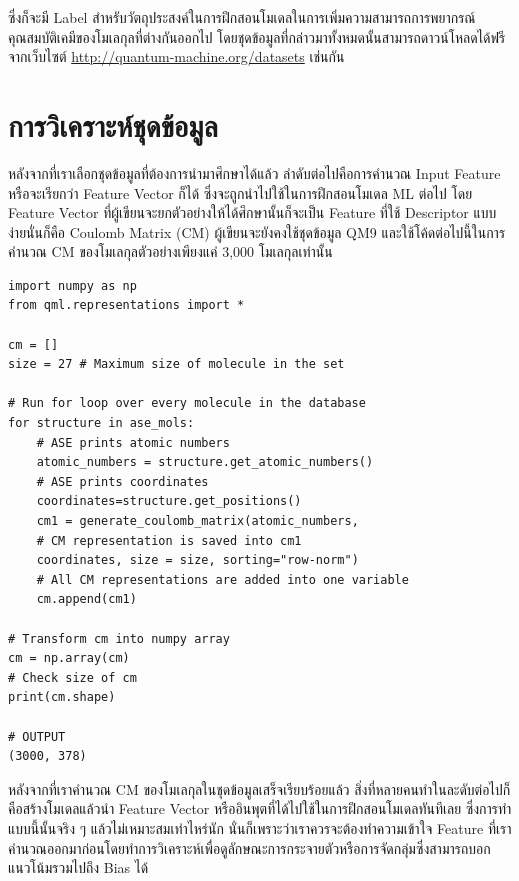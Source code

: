 \noindent ซึ่งก็จะมี Label สำหรับวัตถุประสงค์ในการฝึกสอนโมเดลในการเพิ่มความสามารถการพยากรณ์คุณสมบัติเคมีของโมเลกุลที่ต่างกันออกไป 
โดยชุดข้อมูลที่กล่าวมาทั้งหมดนั้นสามารถดาวน์โหลดได้ฟรีจากเว็บไซต์ \url{http://quantum-machine.org/datasets} เช่นกัน

\section{การวิเคราะห์ชุดข้อมูล}
\label{sec:dataset_analysis}

หลังจากที่เราเลือกชุดข้อมูลที่ต้องการนำมาศึกษาได้แล้ว ลำดับต่อไปคือการคำนวณ Input Feature หรือจะเรียกว่า Feature Vector ก็ได้
ซึ่งจะถูกนำไปใช้ในการฝึกสอนโมเดล ML ต่อไป โดย Feature Vector ที่ผู้เขียนจะยกตัวอย่างให้ได้ศึกษานั้นก็จะเป็น Feature ที่ใช้ Descriptor 
แบบง่ายนั่นก็คือ Coulomb Matrix (CM) ผู้เขียนจะยังคงใช้ชุดข้อมูล QM9 และใช้โค้ดต่อไปนี้ในการคำนวณ CM ของโมเลกุลตัวอย่างเพียงแค่ 3,000 
โมเลกุลเท่านั้น

\begin{lstlisting}[style=MyPython]
import numpy as np
from qml.representations import * 

cm = []
size = 27 # Maximum size of molecule in the set

# Run for loop over every molecule in the database
for structure in ase_mols: 
    # ASE prints atomic numbers 
    atomic_numbers = structure.get_atomic_numbers() 
    # ASE prints coordinates
    coordinates=structure.get_positions() 
    cm1 = generate_coulomb_matrix(atomic_numbers,
    # CM representation is saved into cm1
    coordinates, size = size, sorting="row-norm") 
    # All CM representations are added into one variable
    cm.append(cm1) 

# Transform cm into numpy array
cm = np.array(cm) 
# Check size of cm
print(cm.shape)

# OUTPUT
(3000, 378)
\end{lstlisting}

หลังจากที่เราคำนวณ CM ของโมเลกุลในชุดข้อมูลเสร็จเรียบร้อยแล้ว สิ่งที่หลายคนทำในละดับต่อไปก็คือสร้างโมเดลแล้วนำ Feature Vector 
หรืออินพุตที่ได้ไปใช้ในการฝึกสอนโมเดลทันทีเลย ซึ่งการทำแบบนี้นั้นจริง ๆ แล้วไม่เหมาะสมเท่าไหร่นัก นั่นก็เพราะว่าเราควรจะต้องทำความเข้าใจ 
Feature ที่เราคำนวณออกมาก่อนโดยทำการวิเคราะห์เพื่อดูลักษณะการกระจายตัวหรือการจัดกลุ่มซึ่งสามารถบอกแนวโน้มรวมไปถึง Bias ได้


